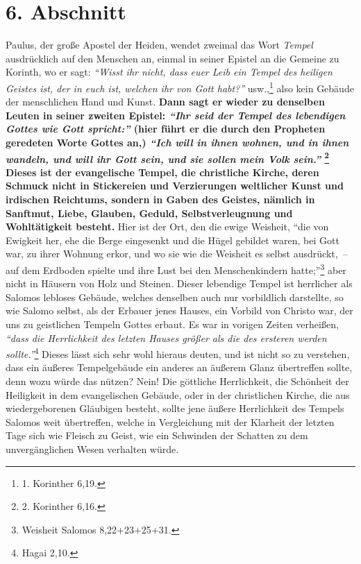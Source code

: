 \section{6. Abschnitt} \label{kap5_ab6}

Paulus, der große Apostel der Heiden, wendet zweimal das Wort \textit{Tempel}
ausdrücklich auf den Menschen an, einmal in seiner Epistel an die Gemeine zu
Korinth, wo er sagt:
\textit{"`Wisst ihr nicht, dass euer Leib ein Tempel des heiligen
Geistes ist, der in euch ist, welchen ihr von Gott habt?"'} usw.,\footnote{1.
Korinther 6,19.}
also kein Gebäude der menschlichen Hand und Kunst.
\label{ref:05_06_tempel}
\textbf{Dann sagt er
wieder zu denselben Leuten in seiner zweiten Epistel:
\textit{"`Ihr seid der Tempel des lebendigen Gottes wie Gott spricht:"'} (hier
führt er die durch den Propheten
geredeten Worte Gottes an,)
\textit{"`Ich will in ihnen wohnen, und in ihnen wandeln, und will ihr Gott
sein, und sie sollen mein Volk sein."'}
\footnote{2. Korinther 6,16.}
Dieses ist der
evangelische Tempel, die christliche Kirche, deren
Schmuck nicht in Stickereien
und Verzierungen weltlicher Kunst und irdischen Reichtums, sondern in Gaben des
Geistes, nämlich in Sanftmut, Liebe, Glauben, Geduld,
Selbstverleugnung und
Wohltätigkeit besteht.} Hier ist der Ort, den die ewige Weisheit, "`die von
Ewigkeit her, ehe die Berge eingesenkt und die Hügel gebildet waren, bei Gott
war, zu ihrer Wohnung erkor, und wo sie wie die Weisheit es selbst ausdrückt,~--
auf dem Erdboden spielte und ihre Lust bei den Menschenkindern
hatte;"'\footnote{Weisheit Salomos 8,22+23+25+31.}
aber nicht in Häusern von Holz
und Steinen. Dieser lebendige Tempel ist herrlicher als Salomos lebloses
Gebäude, welches denselben auch nur vorbildlich darstellte, so wie Salomo
selbst, als der Erbauer jenes Hauses, ein Vorbild von Christo war, der uns zu
geistlichen Tempeln Gottes erbaut. Es war in vorigen Zeiten verheißen,
\textit{"`dass die Herrlichkeit des letzten Hauses größer als die des ersteren
werden
sollte."'}\footnote{Hagai 2,10.}
Dieses lässt sich sehr wohl hieraus deuten, und
ist nicht so zu verstehen, dass ein äußeres Tempelgebäude ein anderes an äußerem
Glanz übertreffen sollte, denn wozu würde das nützen? Nein! Die göttliche
Herrlichkeit, die Schönheit der Heiligkeit in dem evangelischen Gebäude, oder in
der christlichen Kirche,
die aus wiedergeborenen Gläubigen besteht, sollte jene
äußere Herrlichkeit des Tempels Salomos weit übertreffen, welche in
Vergleichung mit der Klarheit der letzten Tage sich wie Fleisch zu Geist, wie
ein Schwinden der Schatten zu dem unvergänglichen Wesen verhalten würde.


